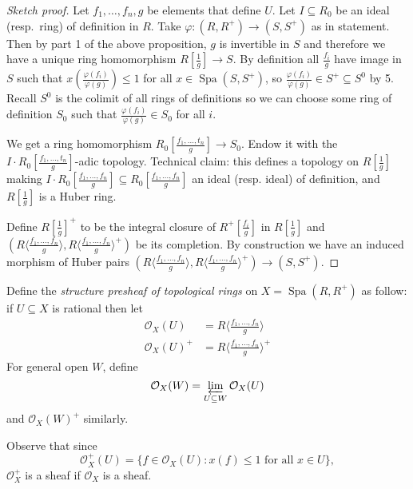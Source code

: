 \documentclass[a4paper]{article}
\newcommand{\sh}[1]{\mathcal{#1}} %
\DeclareMathOperator{\Spa}{Spa}
\begin{document}
\begin{proof}[Sketch proof]
  Let \(f_1, \dots, f_n, g\) be elements that define \(U\). Let \(I \subseteq R_0\) be an ideal (resp.\ ring) of definition in \(R\). Take \(\varphi: (R, R^+) \to (S, S^+)\) as in statement. Then by part 1 of the above proposition, \(g\) is invertible in \(S\) and therefore we have a unique ring homomorphism \(R[\frac{1}{g}] \to S\). By definition all \(\frac{f_i}{g}\) have image in \(S\) such that \(x(\frac{\varphi(f_i)}{\varphi(g)}) \leq 1\) for all \(x \in \Spa(S, S^+)\), so \(\frac{\varphi(f_i)}{\varphi(g)} \in S^+ \subseteq S^0\) by  5. Recall \(S^0\) is the colimit of all rings of definitions so we can choose some ring of definition \(S_0\) such that \(\frac{\varphi(f_i)}{\varphi(g)} \in S_0\) for all \(i\).

  We get a ring homomorphism \(R_0[\frac{f_1, \dots, t_n}{g}] \to S_0\). Endow it with the \(I \cdot R_0 [\frac{f_1, \dots, t_n}{g}]\)-adic topology. Technical claim: this defines a topology on \(R[\frac{1}{g}]\) making \(I \cdot R_0[\frac{f_1, \dots, f_n}{g}] \subseteq R_0[\frac{f_1, \dots, f_n}{g}]\) an ideal (resp. ideal) of definition, and \(R[\frac{1}{g}]\) is a Huber ring.

  Define \(R[\frac{1}{g}]^+\) to be the integral closure of \(R^+[\frac{f_i}{g}]\) in \(R[\frac{1}{g}]\) and \((R \langle \frac{f_1, \dots, f_n}{g}\rangle, R \langle \frac{f_1, \dots, f_n}{g}\rangle^+)\) be its completion. By construction we have an induced morphism of Huber pairs \((R \langle \frac{f_1, \dots, f_n}{g}\rangle, R \langle \frac{f_1, \dots, f_n}{g}\rangle^+) \to (S, S^+)\).
\end{proof}

\begin{definition}
  Define the \emph{structure presheaf of topological rings} on \(X = \Spa(R, R^+)\) as follow: if \(U \subseteq X\) is rational then let
  \begin{align*}
    \sh O_X(U) &= R \langle \tfrac{f_1, \dots, f_n}{g} \rangle \\
    \sh O_X(U)^+ &= R \langle \tfrac{f_1, \dots, f_n}{g} \rangle^+
  \end{align*}
  For general open \(W\), define
  \[
    \sh O_X(W) = \varprojlim_{U \subseteq W} \sh O_X(U)
  \]
  and \(\sh O_X(W)^+\) similarly.
\end{definition}

Observe that since
\[
  \sh O_X^+(U) = \{f \in \sh O_X(U): x(f) \leq 1 \text{ for all } x \in U\},
\]
\(\sh O_X^+\) is a sheaf if \(\sh O_X\) is a sheaf.
\end{document}
